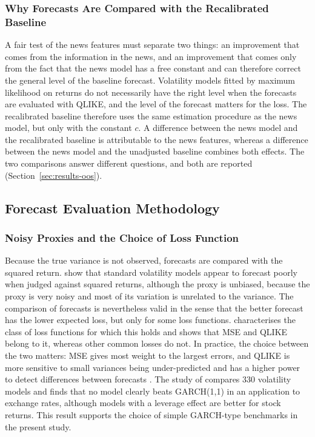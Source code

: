 \documentclass[12pt,a4paper]{article}
\begin{document}
\subsubsection{Why Forecasts Are Compared with the Recalibrated Baseline}\label{sec:method-recal}
A fair test of the news features must separate two things: an improvement that comes from the information in the news, and an improvement that comes only from the fact that the news model has a free constant and can therefore correct the general level of the baseline forecast. Volatility models fitted by maximum likelihood on returns do not necessarily have the right level when the forecasts are evaluated with QLIKE, and the level of the forecast matters for the loss. The recalibrated baseline therefore uses the same estimation procedure as the news model, but only with the constant $c$. A difference between the news model and the recalibrated baseline is attributable to the news features, whereas a difference between the news model and the unadjusted baseline combines both effects. The two comparisons answer different questions, and both are reported (Section~\ref{sec:results-oos}).

\subsection{Forecast Evaluation Methodology}\label{sec:method-evaluation}
\subsubsection{Noisy Proxies and the Choice of Loss Function}\label{sec:method-proxy}
Because the true variance is not observed, forecasts are compared with the squared return. \textcite{andersen1998} show that standard volatility models appear to forecast poorly when judged against squared returns, although the proxy is unbiased, because the proxy is very noisy and most of its variation is unrelated to the variance. The comparison of forecasts is nevertheless valid in the sense that the better forecast has the lower expected loss, but only for some loss functions. \textcite{patton2011} characterises the class of loss functions for which this holds and shows that MSE and QLIKE belong to it, whereas other common losses do not. In practice, the choice between the two matters: MSE gives most weight to the largest errors, and QLIKE is more sensitive to small variances being under-predicted and has a higher power to detect differences between forecasts \parencite{patton2011}. The study of \textcite{hansen2005} compares 330 volatility models and finds that no model clearly beats GARCH(1,1) in an application to exchange rates, although models with a leverage effect are better for stock returns. This result supports the choice of simple GARCH-type benchmarks in the present study.
\end{document}
